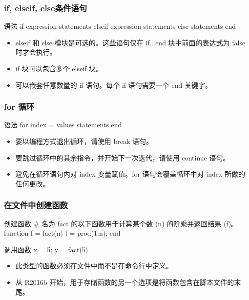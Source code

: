 \documentclass[dvipsnames, svgnames, x11names]{beamer}
\begin{document}
\begin{frame}[fragile]
    \frametitle{if, elseif, else条件语句}
\begin{codeblock}{语法}
if expression
    statements
elseif expression
    statements
else
    statements
end
\end{codeblock}
\begin{itemize}
  \item elseif 和 else 模块是可选的。这些语句仅在 if...end 块中前面的表达式为 false 时才会执行。
  \item if 块可以包含多个 elseif 块。
  \item 可以嵌套任意数量的 if 语句。每个 if 语句需要一个 end 关键字。
\end{itemize}
\end{frame}


\begin{frame}[fragile]
    \frametitle{for 循环}
\begin{codeblock}{语法}
for index = values
    statements
end
\end{codeblock}
\begin{itemize}
  \item 要以编程方式退出循环，请使用 break 语句。
  \item 要跳过循环中的其余指令，并开始下一次迭代，请使用 continue 语句。
  \item 避免在循环语句内对 index 变量赋值。for 语句会覆盖循环中对 index 所做的任何更改。
\end{itemize}
\end{frame}


\begin{frame}[fragile]
    \frametitle{在文件中创建函数}
\begin{codeblock}{创建函数}
# 名为 fact 的以下函数用于计算某个数 (n) 的阶乘并返回结果 (f)。
function f = fact(n)
    f = prod(1:n);
end
\end{codeblock}
\begin{codeblock}{调用函数}
x = 5;
y = fact(5)
\end{codeblock}
\begin{itemize}
  \item 此类型的函数必须在文件中而不是在命令行中定义。
  \item 从 R2016b 开始，用于存储函数的另一个选项是将函数包含在脚本文件的末尾。
\end{itemize}
\end{frame}
\end{document}
